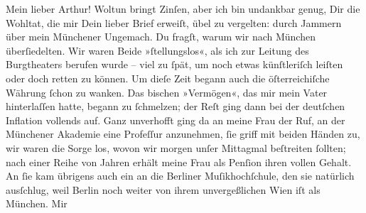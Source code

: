 \pstart{}Mein lieber Arthur!\pend\vspace{0.5em}
\pstart
           Woltun bringt Zinſen, aber ich bin undankbar genug, Dir die Wohltat, die mir Dein
               lieber Brief erweiſt, übel zu vergelten: durch Jammern über mein Münchener Ungemach. Du fragſt, warum wir nach München überſiedelten. Wir waren Beide »ſtellungslos«, als ich zur Leitung
               des Burgtheaters berufen wurde – viel zu ſpät, um
               noch etwas künſtleriſch leiſten oder doch retten zu können. Um dieſe Zeit begann auch
               die öſterreichiſche Währung ſchon zu wanken.
               Das bischen »Vermögen«, das mir mein Vater hinterlaſſen hatte, begann zu ſchmelzen; der Reſt
               ging dann bei der deutſchen Inflation vollends
               auf. Ganz unverhofft ging da an meine Frau der Ruf, an der Münchener Akademie eine Profeſſur anzunehmen, ſie griff mit beiden Händen
               zu, wir waren die Sorge los, wovon wir morgen unſer Mittagmal {\pb}beſtreiten ſollten; nach einer Reihe von Jahren
               erhält meine Frau als
               Penſion ihren vollen Gehalt. An ſie kam übrigens auch ein \label{K_L02534-1v}\label{K_L02534-1} an die Berliner
                  Muſikhochſchule, den sie natürlich ausſchlug, weil Berlin noch weiter von ihrem unvergeßlichen Wien iſt als München. Mir
